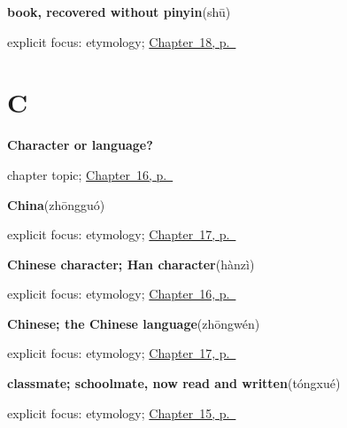 \noindent\begin{minipage}[t]{\linewidth}
\raggedright
\textbf{book, recovered without pinyin}\enspace\emph{}\enspace(shū)\par
\footnotesize explicit focus: etymology; \hyperref[ch:zh-looking-reading]{Chapter~18, p.~\pageref*{ch:zh-looking-reading}}
\end{minipage}\par\smallskip

\section*{C}

\noindent\begin{minipage}[t]{\linewidth}
\raggedright
\textbf{Character or language?}\par
\footnotesize chapter topic; \hyperref[ch:zh-language-identity]{Chapter~16, p.~\pageref*{ch:zh-language-identity}}
\end{minipage}\par\smallskip

\noindent\begin{minipage}[t]{\linewidth}
\raggedright
\textbf{China}\enspace\emph{}\enspace(zhōngguó)\par
\footnotesize explicit focus: etymology; \hyperref[ch:zh-language-country]{Chapter~17, p.~\pageref*{ch:zh-language-country}}
\end{minipage}\par\smallskip

\noindent\begin{minipage}[t]{\linewidth}
\raggedright
\textbf{Chinese character; Han character}\enspace\emph{}\enspace(hànzì)\par
\footnotesize explicit focus: etymology; \hyperref[ch:zh-language-identity]{Chapter~16, p.~\pageref*{ch:zh-language-identity}}
\end{minipage}\par\smallskip

\noindent\begin{minipage}[t]{\linewidth}
\raggedright
\textbf{Chinese; the Chinese language}\enspace\emph{}\enspace(zhōngwén)\par
\footnotesize explicit focus: etymology; \hyperref[ch:zh-language-country]{Chapter~17, p.~\pageref*{ch:zh-language-country}}
\end{minipage}\par\smallskip

\noindent\begin{minipage}[t]{\linewidth}
\raggedright
\textbf{classmate; schoolmate, now read and written}\enspace\emph{}\enspace(tóngxué)\par
\footnotesize explicit focus: etymology; \hyperref[ch:zh-school-compounds]{Chapter~15, p.~\pageref*{ch:zh-school-compounds}}
\end{minipage}\par\smallskip


